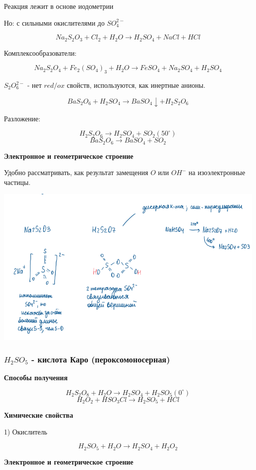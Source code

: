 \documentclass[14pt,a4paper]{scrartcl}
\begin{document}
Реакция лежит в основе иодометрии

Но: с сильными окислителями до $SO_4^{2-}$

$$Na_2S_2O_3 + Cl_2 + H_2O \rightarrow H_2SO_4 + NaCl + HCl$$

Комплексообразователи:

$$Na_2S_2O_4 + Fe_2(SO_4)_3 + H_2O \rightarrow FeSO_4 + Na_2SO_4 + H_2SO_4$$

$S_2O_6^{2-}$ - нет $red/ox$ свойств, используются, как инертные анионы.

$$BaS_2O_6 + H_2SO_4 \rightarrow BaSO_4\downarrow + H_2S_2O_6$$

Разложение:

$$H_2S_2O_6 \rightarrow H_2SO_4 + SO_2 (50^{\circ})$$
$$BaS_2O_6 \rightarrow BaSO_4 + SO_2$$

\textbf{Электронное и геометрическое строение}

Удобно рассматривать, как результат замещения $O$ или $OH^-$ на изоэлектронные частицы.

\includegraphics{7v8.png}

\subsubsection{$H_2SO_5$ - кислота Каро (пероксомоносерная)}

\textbf{Способы получения}

$$H_2S_2O_8 + H_2O \rightarrow H_2SO_4 + H_2SO_5(0^{\circ})$$
$$H_2O_2 + HSO_3Cl \rightarrow H_2SO_5 + HCl$$

\textbf{Химические свойства}

1) Окислитель

$$H_2SO_5 + H_2O \rightarrow H_2SO_4 + H_2O_2$$

\textbf{Электронное и геометрическое строение}
\end{document}
